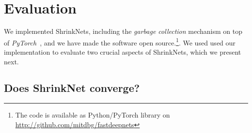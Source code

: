\documentclass[sigconf]{acmart}
\newcommand{\gl}[1]{\textcolor{violet}{{\bf Gl:} #1}}
\begin{document}
\section{Evaluation}

We  implemented ShrinkNets, including the \emph{garbage collection}
mechanism on top of \textit{PyTorch}~\cite{paszke2017automatic}, and we have
made the software open source.\footnote{The code is available as Python/PyTorch
library on \url{http://github.com/mitdbg/fastdeepnets}
}. We used used our implementation to evaluate two crucial aspects of
ShrinkNets, which we present next.


%


\subsection{Does ShrinkNet converge?}
\end{document}
